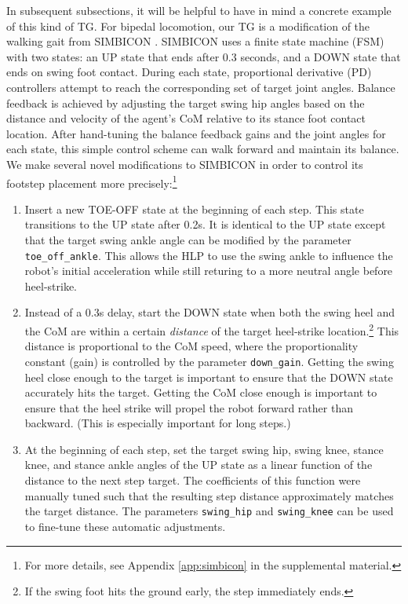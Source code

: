 \documentclass[conference]{IEEEtran}
\begin{document}
In subsequent subsections, it will be helpful to have in mind a concrete example of this kind of TG.
For bipedal locomotion, our TG is a modification of the walking gait from SIMBICON \citep{yin2007simbicon}.
SIMBICON uses a finite state machine (FSM) with two states: an UP state that ends after 0.3 seconds, and a DOWN state that ends on swing foot contact.
During each state, proportional derivative (PD) controllers attempt to reach the corresponding set of target joint angles.
Balance feedback is achieved by adjusting the target swing hip angles based on the distance and velocity of the agent's CoM relative to its stance foot contact location.
After hand-tuning the balance feedback gains and the joint angles for each state, this simple control scheme can walk forward and maintain its balance.
We make several novel modifications to SIMBICON in order to control its footstep placement more precisely:\footnote{
For more details, see Appendix \ref{app:simbicon} in the supplemental material.}
\begin{enumerate}
  \item Insert a new TOE-OFF state at the beginning of each step.
    This state transitions to the UP state after 0.2s.
    It is identical to the UP state except that the target swing ankle angle can be modified by the parameter \texttt{toe\_off\_ankle}.
    This allows the HLP to use the swing ankle to influence the robot's initial acceleration while still returing to a more neutral angle before heel-strike.

  \item Instead of a 0.3s delay, start the DOWN state when both the swing heel and the CoM are within a certain \emph{distance} of the target heel-strike location.\footnote{
    If the swing foot hits the ground early, the step immediately ends.}
    This distance is proportional to the CoM speed, where the proportionality constant (gain) is controlled by the parameter \texttt{down\_gain}.
    Getting the swing heel close enough to the target is important to ensure that the DOWN state accurately hits the target.
    Getting the CoM close enough is important to ensure that the heel strike will propel the robot forward rather than backward.
    (This is especially important for long steps.)

  \item At the beginning of each step, set the target swing hip, swing knee, stance knee, and stance ankle angles of the UP state as a linear function of the distance to the next step target.
    The coefficients of this function were manually tuned such that the resulting step distance approximately matches the target distance.
    The parameters \texttt{swing\_hip} and \texttt{swing\_knee} can be used to fine-tune these automatic adjustments.
\end{enumerate}
\end{document}
